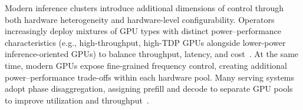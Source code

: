 
Modern inference clusters introduce additional dimensions of control through both hardware heterogeneity and hardware-level configurability.
Operators increasingly deploy mixtures of GPU types with distinct power--performance characteristics (e.g., high-throughput, high-TDP GPUs alongside lower-power inference-oriented GPUs) to balance throughput, latency, and cost~\cite{griggs2024melange,patel2024splitwise}.
At the same time, modern GPUs expose fine-grained frequency control, creating additional power--performance trade-offs within each hardware pool.
Many serving systems adopt phase disaggregation, assigning prefill and decode to separate GPU pools to improve utilization and throughput~\cite{agrawal2024taming,zhong2024distserve,patel2024splitwise}.
